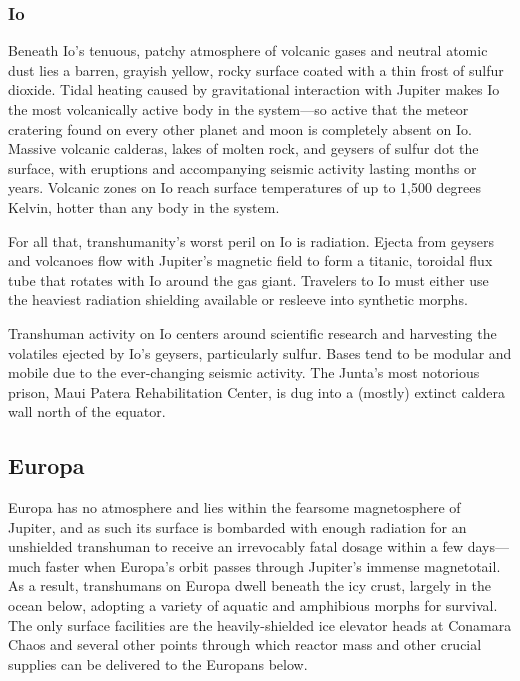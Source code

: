 \subsubsection{Io}

Beneath Io's tenuous, patchy atmosphere of volcanic 
gases and neutral atomic dust lies a barren, grayish 
yellow, rocky surface coated with a thin frost of sulfur 
dioxide. Tidal heating caused by gravitational interaction with Jupiter makes Io the most volcanically 
active body in the system—so active that the meteor 
cratering found on every other planet and moon is 
completely absent on Io. Massive volcanic calderas, 
lakes of molten rock, and geysers of sulfur dot the 
surface, with eruptions and accompanying seismic 
activity lasting months or years. Volcanic zones on 
Io reach surface temperatures of up to 1,500 degrees 
Kelvin, hotter than any body in the system.

For all that, transhumanity's worst peril on Io is 
radiation. Ejecta from geysers and volcanoes flow 
with Jupiter's magnetic field to form a titanic, toroidal 
flux tube that rotates with Io around the gas giant. 
Travelers to Io must either use the heaviest radiation 
shielding available or resleeve into synthetic morphs.

Transhuman activity on Io centers around scientific 
research and harvesting the volatiles ejected by Io's 
geysers, particularly sulfur. Bases tend to be modular 
and mobile due to the ever-changing seismic activity. 
The Junta's most notorious prison, Maui Patera Rehabilitation Center, is dug into a (mostly) extinct caldera 
wall north of the equator.

\subsection{Europa}

Europa has no atmosphere and lies within the fearsome magnetosphere of Jupiter, and as such its surface 
is bombarded with enough radiation for an unshielded 
transhuman to receive an irrevocably fatal dosage 
within a few days—much faster when Europa's orbit 
passes through Jupiter's immense magnetotail. As a 
result, transhumans on Europa dwell beneath the icy 
crust, largely in the ocean below, adopting a variety of 
aquatic and amphibious morphs for survival. The only 
surface facilities are the heavily-shielded ice elevator 
heads at Conamara Chaos and several other points 
through which reactor mass and other crucial supplies 
can be delivered to the Europans below.

